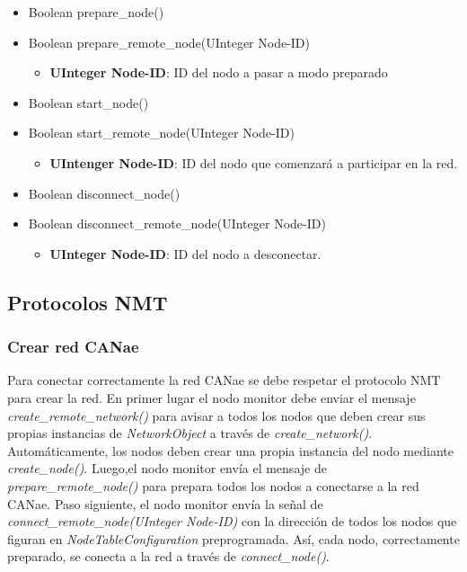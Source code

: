 \begin{itemize}
\item Boolean prepare\_node()
\item Boolean prepare\_remote\_node(UInteger Node-ID)
  \begin{itemize}
   \item \textbf{UInteger Node-ID}: ID del nodo a pasar a modo preparado
  \end{itemize}
\item Boolean start\_node()
\item Boolean start\_remote\_node(UInteger Node-ID)
  \begin{itemize}
    \item \textbf{UIntenger Node-ID}: ID del nodo que comenzará a participar en la red.
   \end{itemize}
\item Boolean disconnect\_node()
\item Boolean disconnect\_remote\_node(UInteger Node-ID)
  \begin{itemize}
    \item \textbf{UInteger Node-ID}: ID del nodo a desconectar.
  \end{itemize}
\end{itemize}

\subsection{Protocolos NMT}
\subsubsection{Crear red CANae}
Para conectar correctamente la red CANae se debe respetar el protocolo NMT para
crear la red. En primer lugar el nodo monitor debe enviar el mensaje
\textit{create\_remote\_network()} para avisar a todos los nodos que deben crear
sus propias instancias de \textit{NetworkObject} a través de
\textit{create\_network()}. Automáticamente, los nodos deben crear una propia
instancia del nodo mediante \textit{create\_node()}. Luego,el nodo monitor
envía el mensaje de \textit{prepare\_remote\_node()} para prepara todos los
nodos a conectarse a la red CANae. Paso siguiente, el nodo monitor envía la señal de
\textit{connect\_remote\_node(UInteger Node-ID)} con la dirección de todos los
nodos que figuran en \textit{NodeTableConfiguration} preprogramada.
Así, cada nodo, correctamente preparado, se conecta a la red a través de
\textit{connect\_node()}.

